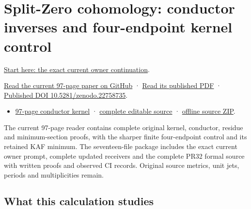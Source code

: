 \documentclass[
]{article}
\providecommand{\tightlist}{%
  \setlength{\itemsep}{0pt}\setlength{\parskip}{0pt}}
\begin{document}
\section{Split-Zero cohomology: conductor inverses and four-endpoint
kernel
control}\label{split-zero-cohomology-conductor-inverses-and-four-endpoint-kernel-control}

\href{https://github.com/KokunoYumeto/zeta-function-research-reader/blob/41adc412ceb119ad9086b1f106e377f3de2d401a/workbenches/splitzero-tandem/continuations/20260914-conductor-kernel-continuation/00_CONTINUE_HERE.md}{Start
here: the exact current owner continuation}.

\href{https://github.com/KokunoYumeto/zeta-function-research-reader/blob/41adc412ceb119ad9086b1f106e377f3de2d401a/workbenches/splitzero-tandem/continuations/20260914-conductor-kernel-continuation/15_CURRENT_MIXED_CONTROL_READER.pdf}{Read
the current 97-page paper on GitHub} ·
\href{https://zenodo.org/api/records/22758735/files/55-conductor-kernel-reader.pdf/content}{Read
its published PDF} ·
\href{https://doi.org/10.5281/zenodo.22758735}{Published DOI
10.5281/zenodo.22758735}.

\begin{itemize}
\tightlist
\item
  \href{https://zenodo.org/api/records/22758735/files/55-conductor-kernel-reader.pdf/content}{97-page
  conductor kernel} ·
  \href{https://github.com/KokunoYumeto/zeta-function-research-reader/tree/41adc412ceb119ad9086b1f106e377f3de2d401a/workbenches/splitzero-tandem/continuations/20260914-conductor-kernel-continuation}{complete
  editable source} ·
  \href{https://zenodo.org/api/records/22758735/files/56-conductor-kernel-sources.zip/content}{offline
  source ZIP}.
\end{itemize}

The current 97-page reader contains complete original kernel, conductor,
residue and minimum-section proofs, with the sharper finite
four-endpoint control and its retained KAF minimum. The seventeen-file
package includes the exact current owner prompt, complete updated
receivers and the complete PR32 formal source with written proofs and
observed CI records. Original source metrics, unit jets, periods and
multiplicities remain.

\subsection{What this calculation
studies}\label{what-this-calculation-studies-2}
\end{document}
